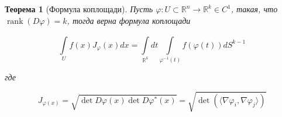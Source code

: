 \documentclass[a5paper]{article}
\newcounter{through}
\theoremstyle{plain}
\newtheorem{theorem}[through]{Теорема}
\theoremstyle{definition}
\numberwithin{through}{section}
\numberwithin{equation}{section}
\DeclareMathOperator{\rank}{rank}
\begin{document}
\begin{theorem}[Формула коплощади]
	Пусть $\varphi : U \subset \mathbb{R}^n \to \mathbb{R}^k \in C^1$, такая, что $\rank (D \varphi) = k$, тогда верна формула коплощади
	
	\begin{equation*}
		\int\limits_{U}^{} f(x) J_{\varphi}(x) dx = \int\limits_{\mathbb{R}^k}^{}dt \int\limits_{\varphi^{-1}(t)} f(\varphi(t)) dS^{k-1}
	\end{equation*} 
	
	где 
	
	\begin{equation*}
		J_{\varphi(x)} = \sqrt{\det D \varphi (x) \det D \varphi^* (x)} = \sqrt{\det (\langle \nabla \varphi_i, \nabla \varphi_j \rangle)}
	\end{equation*}
\end{theorem}
\end{document}
